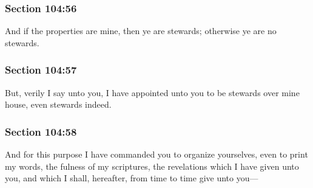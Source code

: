 	\subsubsection{Section 104:56} %
		\label{DC104-56}

		And if the properties are mine, then ye are stewards; otherwise ye are no stewards.


	\subsubsection{Section 104:57} %
		\label{DC104-57}

		But, verily I say unto you, I have appointed unto you to be stewards over mine house, even stewards indeed.


	\subsubsection{Section 104:58} %
		\label{DC104-58}

		And for this purpose I have commanded you to organize yourselves, even to print my words, the fulness of my scriptures, the revelations which I have given unto you, and which I shall, hereafter, from time to time give unto you---


